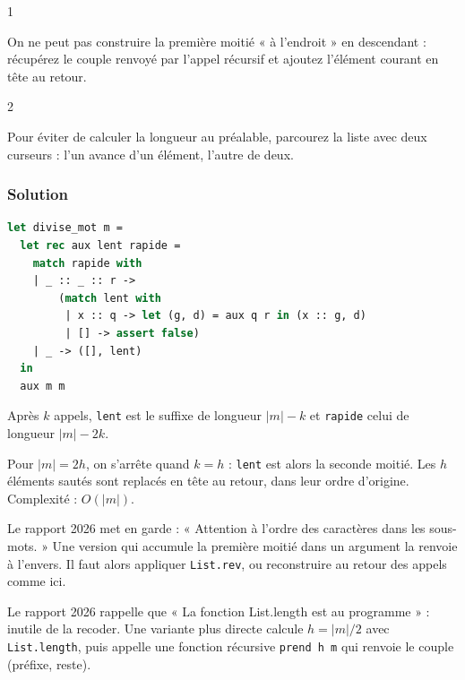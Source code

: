 \documentclass[11pt,a4paper]{article}
\begin{document}
\begin{indication}{1}

On ne peut pas construire la première moitié « à l'endroit » en descendant : récupérez le couple renvoyé par l'appel récursif et ajoutez l'élément courant en tête au retour.

\end{indication}

\begin{indication}{2}

Pour éviter de calculer la longueur au préalable, parcourez la liste avec deux curseurs : l'un avance d'un élément, l'autre de deux.

\end{indication}

\hypertarget{solution-30}{%
\subsubsection{Solution}\label{solution-30}}

\begin{lstlisting}[language=Caml]
let divise_mot m =
  let rec aux lent rapide =
    match rapide with
    | _ :: _ :: r ->
        (match lent with
         | x :: q -> let (g, d) = aux q r in (x :: g, d)
         | [] -> assert false)
    | _ -> ([], lent)
  in
  aux m m
\end{lstlisting}

Après \(k\) appels, \texttt{lent} est le suffixe de longueur \(|m|-k\) et \texttt{rapide} celui de longueur \(|m|-2k\).

Pour \(|m|=2h\), on s'arrête quand \(k=h\) : \texttt{lent} est alors la seconde moitié. Les \(h\) éléments sautés sont replacés en tête au retour, dans leur ordre d'origine. Complexité : \(O(|m|)\).

\begin{piege}

Le rapport 2026 met en garde : « Attention à l'ordre des caractères dans les sous-mots. » Une version qui accumule la première moitié dans un argument la renvoie à l'envers. Il faut alors appliquer \texttt{List.rev}, ou reconstruire au retour des appels comme ici.

\end{piege}

\begin{methode}

Le rapport 2026 rappelle que « La fonction List.length est au programme » : inutile de la recoder. Une variante plus directe calcule \(h=|m|/2\) avec \texttt{List.length}, puis appelle une fonction récursive \texttt{prend\ h\ m} qui renvoie le couple (préfixe, reste).

\end{methode}
\end{document}
